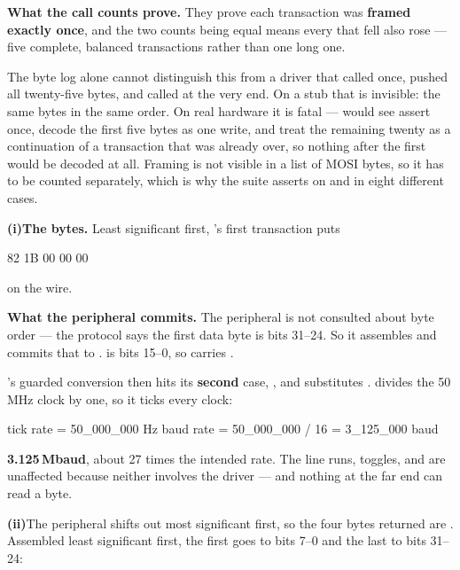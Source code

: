 \textbf{What the call counts prove.} They prove each transaction was \textbf{framed exactly once},
and the two counts being equal means every  that fell also rose --- five complete, balanced
transactions rather than one long one.

The byte log alone cannot distinguish this from a driver that called  once, pushed
all twenty-five bytes, and called  at the very end. On a stub that is invisible: the
same bytes in the same order. On real hardware it is fatal ---  would see
 assert once, decode the first five bytes as one  write, and treat
the remaining twenty as a continuation of a transaction that was already over, so nothing after the
first would be decoded at all. Framing is not visible in a list of MOSI bytes, so it has to be
counted separately, which is why the suite asserts on  and  in
eight different cases. 

\noindent\textbf{(i)}\enspace\textbf{The bytes.} Least significant first, 's
first transaction puts

\begin{console}
82 1B 00 00 00
\end{console}

\noindent on the wire. 

\textbf{What the peripheral commits.} The peripheral is not consulted about byte order --- the
protocol says the first data byte is bits 31--24. So it assembles  and commits that
to .  is bits 15--0, so  carries .

's guarded conversion then hits its \textbf{second} case,
, and substitutes .  divides the 50\,MHz clock by
one, so it ticks every clock:

\begin{console}
tick rate = 50_000_000 Hz
baud rate = 50_000_000 / 16 = 3_125_000 baud
\end{console}

\noindent \textbf{3.125\,Mbaud}, about 27 times the intended rate. The line runs,  toggles,
 and  are unaffected because neither involves the driver --- and
nothing at the far end can read a byte. 

\medskip\noindent\textbf{(ii)}\enspace The peripheral shifts  out most significant
first, so the four bytes returned are . Assembled least significant first, the
first goes to bits 7--0 and the last to bits 31--24:

